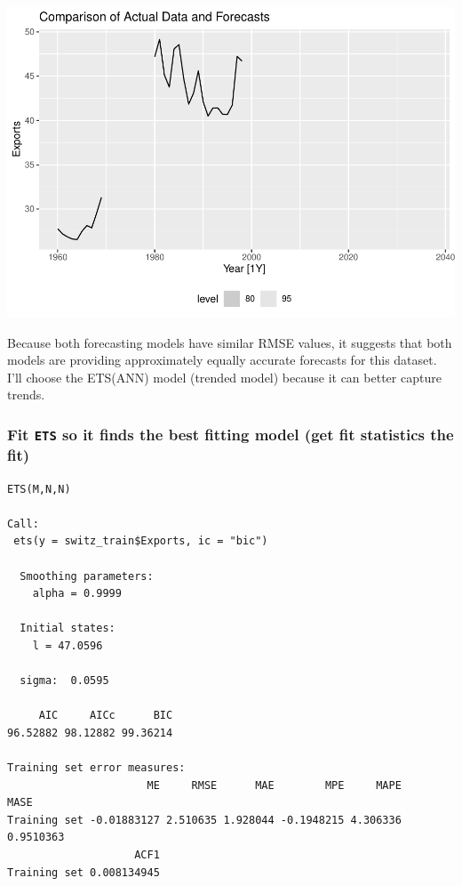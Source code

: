 \documentclass[
]{article}
\newenvironment{Shaded}{\begin{snugshade}}{\end{snugshade}}
\newcommand{\AttributeTok}[1]{\textcolor[rgb]{0.13,0.29,0.53}{#1}}
\newcommand{\CommentTok}[1]{\textcolor[rgb]{0.56,0.35,0.01}{\textit{#1}}}
\newcommand{\FunctionTok}[1]{\textcolor[rgb]{0.13,0.29,0.53}{\textbf{#1}}}
\newcommand{\NormalTok}[1]{#1}
\newcommand{\OtherTok}[1]{\textcolor[rgb]{0.56,0.35,0.01}{#1}}
\newcommand{\SpecialCharTok}[1]{\textcolor[rgb]{0.81,0.36,0.00}{\textbf{#1}}}
\newcommand{\StringTok}[1]{\textcolor[rgb]{0.31,0.60,0.02}{#1}}
\begin{document}
\includegraphics{MontgomeryR_Assignment3_files/figure-latex/unnamed-chunk-7-1.pdf}

Because both forecasting models have similar RMSE values, it suggests
that both models are providing approximately equally accurate forecasts
for this dataset. I'll choose the ETS(ANN) model (trended model) because
it can better capture trends.

\hypertarget{fit-ets-so-it-finds-the-best-fitting-model-get-fit-statistics-the-fit}{%
\subsubsection{\texorpdfstring{Fit \texttt{ETS} so it finds the best
fitting model (get fit statistics the
fit)}{Fit ETS so it finds the best fitting model (get fit statistics the fit)}}\label{fit-ets-so-it-finds-the-best-fitting-model-get-fit-statistics-the-fit}}

\begin{Shaded}
\end{Shaded}

\begin{verbatim}
ETS(M,N,N) 

Call:
 ets(y = switz_train$Exports, ic = "bic") 

  Smoothing parameters:
    alpha = 0.9999 

  Initial states:
    l = 47.0596 

  sigma:  0.0595

     AIC     AICc      BIC 
96.52882 98.12882 99.36214 

Training set error measures:
                      ME     RMSE      MAE        MPE     MAPE      MASE
Training set -0.01883127 2.510635 1.928044 -0.1948215 4.306336 0.9510363
                    ACF1
Training set 0.008134945
\end{verbatim}
\end{document}
